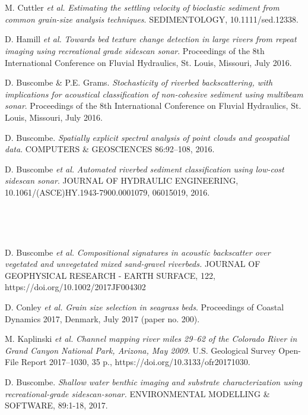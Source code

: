 \documentclass{article} %
\def\sf{\sffamily}
\def\sl{\slshape}
\newlength\sidebarwidth
\newcommand{\subtopic}[3][]
	 {\begin{minipage}{\textwidth}
	 \vspace*{.4\baselineskip}
         \nopagebreak\hspace{0in}%
         \nopagebreak\begin{minipage}[t]{\sidebarwidth - .2cm}
         \raggedleft {\sf\fontseries{sbc}\selectfont #2}
         {\\[-0.2\baselineskip] \textcolor{gray}{\footnotesize #1}}
	 \end{minipage}%
	 \hfill
	 \begin{minipage}[t]{\linewidth - \sidebarwidth}
	 #3%
	 \end{minipage}%
	 \vspace*{.2\baselineskip plus 1\baselineskip minus
	 .2\baselineskip}%
	 \end{minipage}}
\begin{document}
\subtopic{\hspace*{-3ex} 2016}{~
  \begin{itemize}[leftmargin=0ex, itemsep=0ex, parsep=.5ex, labelindent=-4ex]

    \publication
      M. Cuttler {\sl et al.}
      {\sl Estimating the settling velocity of bioclastic sediment from common grain-size analysis techniques}.
      SEDIMENTOLOGY, 10.1111/sed.12338.

    \publication
      D. Hamill {\sl et al.}
      {\sl Towards bed texture change detection in large rivers from repeat imaging using recreational grade sidescan sonar}.
      Proceedings of the 8th International Conference on Fluvial Hydraulics, St. Louis, Missouri, July 2016.

    \publication
      D. Buscombe \& P.E. Grams.
      {\sl Stochasticity of riverbed backscattering, with implications for acoustical classification of non-cohesive sediment using multibeam sonar}.
      Proceedings of the 8th International Conference on Fluvial Hydraulics, St. Louis, Missouri, July 2016.

    \publication
      D. Buscombe.
      {\sl Spatially explicit spectral analysis of point clouds and geospatial data}.
      COMPUTERS \& GEOSCIENCES 86:92--108, 2016.

    \publication
      D. Buscombe {\sl et al.}
      {\sl Automated riverbed sediment classification using low-cost sidescan sonar}.
      JOURNAL OF HYDRAULIC ENGINEERING, 10.1061/(ASCE)HY.1943-7900.0001079, 06015019, 2016.

    \end{itemize}
}

\subtopic{\hspace*{-3ex} 2017}{~
  \begin{itemize}[leftmargin=0ex, itemsep=0ex, parsep=.5ex, labelindent=-4ex]

    \publication
      D. Buscombe {\sl et al.}
      {\sl Compositional signatures in acoustic backscatter over vegetated and unvegetated mixed sand-gravel riverbeds.} 
      JOURNAL OF GEOPHYSICAL RESEARCH - EARTH SURFACE, 122, https://doi.org/10.1002/2017JF004302

    \publication
      D. Conley {\sl et al.}
      {\sl Grain size selection in seagrass beds}.
      Proceedings of Coastal Dynamics 2017, Denmark, July 2017 (paper no. 200).

    \publication
      M. Kaplinski {\sl et al.}
      {\sl Channel mapping river miles 29–62 of the Colorado River in Grand Canyon National Park, Arizona, May 2009}.
      U.S. Geological Survey Open-File Report 2017–1030, 35 p., https://doi.org/10.3133/ofr20171030.

    \publication
      D. Buscombe.
      {\sl Shallow water benthic imaging and substrate characterization using recreational-grade sidescan-sonar.}
      ENVIRONMENTAL MODELLING \& SOFTWARE, 89:1-18, 2017.

    \end{itemize}
}
\end{document}
